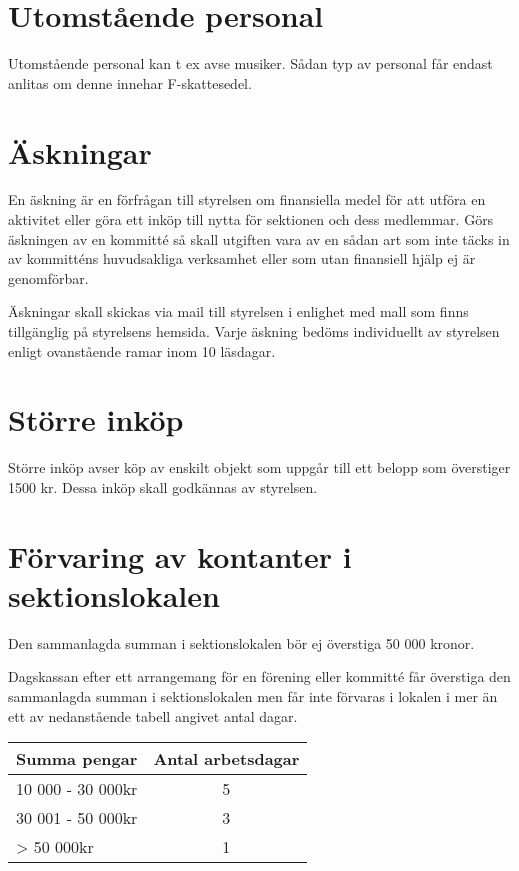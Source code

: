 \documentclass[11pt, includeaddress]{../../classes/cthit}
\begin{document}
\section{Utomstående personal}
Utomstående personal kan t ex avse musiker. Sådan typ av personal får endast anlitas om denne innehar F-skattesedel. 

\section{Äskningar}
En äskning är en förfrågan till styrelsen om finansiella medel för att utföra en aktivitet eller göra ett inköp till nytta för sektionen och dess medlemmar. Görs äskningen av en kommitté så skall utgiften vara av en sådan art som inte täcks in av kommitténs huvudsakliga verksamhet eller som utan finansiell hjälp ej är genomförbar. 

Äskningar skall skickas via mail till styrelsen i enlighet med mall som finns tillgänglig på styrelsens hemsida. Varje äskning bedöms individuellt av styrelsen enligt ovanstående ramar inom 10 läsdagar. 

\section{Större inköp}
Större inköp avser köp av enskilt objekt som uppgår till ett belopp som överstiger 1500 kr. Dessa inköp skall godkännas av styrelsen.

\section{Förvaring av kontanter i sektionslokalen}
Den sammanlagda summan i sektionslokalen bör ej överstiga 50 000 kronor.

Dagskassan efter ett arrangemang för en förening eller kommitté får överstiga den sammanlagda summan i sektionslokalen men får inte förvaras i lokalen i mer än ett av nedanstående tabell angivet antal dagar.

\begin{table}[h]
\centering
\begin{tabular}{  l  c }
	{\large{\textbf{Summa pengar}}} & {\large{\textbf{Antal arbetsdagar}}} \\
	\hline
	{10 000 - 30 000kr} & {5} \\
	{30 001 - 50 000kr} & {3} \\
	{> 50 000kr} & {1} \\
\end{tabular}
\end{table}
\end{document}
